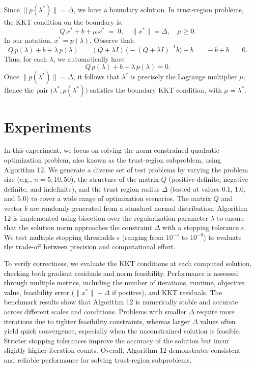 \documentclass[12pt]{article}
\begin{document}
Since \(\|p(\lambda^*)\|=\Delta\), we have a boundary solution. In trust-region problems, the KKT condition on the boundary is:
\[
Q\,x^* + b + \mu \, x^* \;=\; 0, 
\quad
\|x^*\| = \Delta,
\quad
\mu \ge 0.
\]
In our notation, \(x^*=p(\lambda)\). Observe that:
\[
Q\,p(\lambda) + b + \lambda\,p(\lambda)
\;=\;(Q+\lambda I)\,\bigl(-(Q+\lambda I)^{-1}b\bigr) + b 
\;=\;-b + b
\;=\;0.
\]
Thus, for each \(\lambda\), we automatically have
\[
Q\,p(\lambda) + b + \lambda\,p(\lambda) = 0.
\]
Once \(\|p(\lambda^*)\| = \Delta\), it follows that \(\lambda^*\) is precisely the Lagrange multiplier \(\mu\). Hence the pair \(\bigl(\lambda^*, p(\lambda^*)\bigr)\) satisfies the boundary KKT condition, with \(\mu=\lambda^*\). 

\section{Experiments}


In this experiment, we focus on solving the norm-constrained quadratic optimization problem, also known as the trust-region subproblem, using Algorithm 12. We generate a diverse set of test problems by varying the problem size (e.g., $n=5, 10, 50$), the structure of the matrix $Q$ (positive definite, negative definite, and indefinite), and the trust region radius $\Delta$ (tested at values $0.1$, $1.0$, and $5.0$) to cover a wide range of optimization scenarios. The matrix $Q$ and vector $b$ are randomly generated from a standard normal distribution. Algorithm 12 is implemented using bisection over the regularization parameter $\lambda$ to ensure that the solution norm approaches the constraint $\Delta$ with a stopping tolerance $\epsilon$. We test multiple stopping thresholds $\epsilon$ (ranging from $10^{-4}$ to $10^{-8}$) to evaluate the trade-off between precision and computational effort.

To verify correctness, we evaluate the KKT conditions at each computed solution, checking both gradient residuals and norm feasibility. Performance is assessed through multiple metrics, including the number of iterations, runtime, objective value, feasibility error ($\|x^*\| - \Delta$ if positive), and KKT residuals. The benchmark results show that Algorithm 12 is numerically stable and accurate across different scales and conditions. Problems with smaller $\Delta$ require more iterations due to tighter feasibility constraints, whereas larger $\Delta$ values often yield quick convergence, especially when the unconstrained solution is feasible. Stricter stopping tolerances improve the accuracy of the solution but incur slightly higher iteration counts. Overall, Algorithm 12 demonstrates consistent and reliable performance for solving trust-region subproblems.
\end{document}
